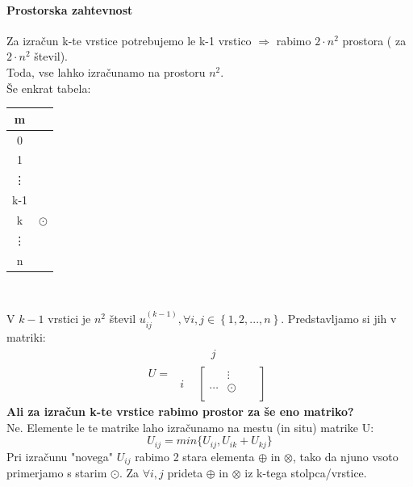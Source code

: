 \documentclass[a4paper,10pt]{article}
\begin{document}
\paragraph{Prostorska zahtevnost}
Za izra\v cun k-te vrstice potrebujemo le k-1 vrstico $\Rightarrow$ rabimo $2 \cdot n^2$ prostora ( za $2 \cdot n^2$ \v stevil).\\
Toda, vse lahko izra\v cunamo na prostoru $n^2$.\\
\v Se enkrat tabela:\\
\begin{center}
\begin{tabular}{c|l}\hline
m	&		\\\hline
0	&		\\
1	&		\\
\vdots	&		\\
k-1	&		\\
k	& $\odot$	\\
\vdots	&		\\
n	&
\end{tabular}\\
\end{center}
V $k-1$ vrstici je $n^2$ \v stevil $u_{ij}^{(k-1)}, \forall i,j \in \left\lbrace 1, 2,..., n \right\rbrace$. Predstavljamo si jih v matriki:
$$
U =
\begin{array}{rc}
					& \begin{array}{ccc} & j &\end{array}	\\
\begin{array}{r}\\i\\\end{array}	& \left[ \begin{array}{ccc} & \vdots & \\ \cdots & \odot &\;\;\; \\ & & \end{array} \right]
\end{array}
$$
\textbf{Ali za izra\v cun k-te vrstice rabimo prostor za \v se eno matriko?}\\
Ne. Elemente le te matrike laho izra\v cunamo na mestu (in situ) matrike U:
$$
U_{ij} = min \lbrace U_{ij}, U_{ik} + U_{kj} \rbrace
$$
Pri izra\v cunu "novega" $U_{ij}$ rabimo 2 stara elementa $\oplus$ in $\otimes$, tako da njuno vsoto primerjamo s starim $\odot$. Za $\forall i,j$ prideta $\oplus$ in $\otimes$ iz k-tega stolpca/vrstice.
\end{document}
